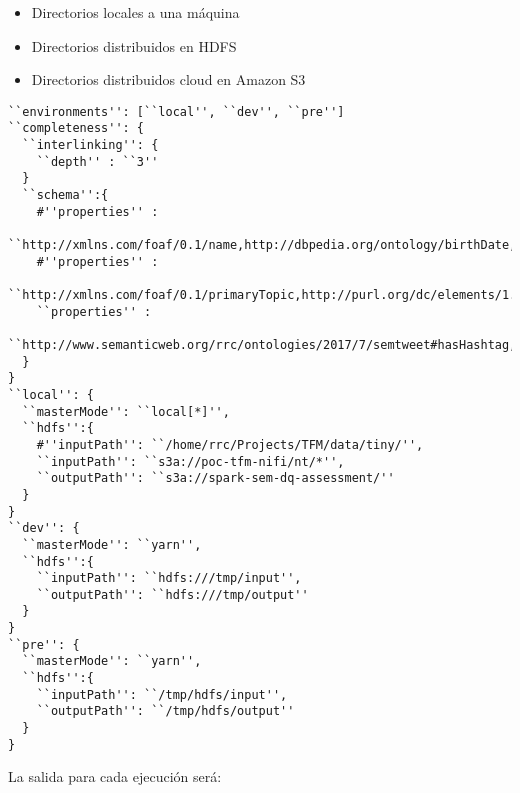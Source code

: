   \begin{itemize}
  \item Directorios locales a una máquina
  \item Directorios distribuidos en \acs{HDFS}
  \item Directorios distribuidos cloud en Amazon S3
  \end{itemize}


\lstset{escapechar=@,language=bash}
\begin{lstlisting}[caption={Archivo de configuración del job},captionpos=b,
    label=application.conf]
``environments'': [``local'', ``dev'', ``pre'']
``completeness'': {
  ``interlinking'': {
    ``depth'' : ``3''
  }
  ``schema'':{
    #''properties'' :
      ``http://xmlns.com/foaf/0.1/name,http://dbpedia.org/ontology/birthDate,http://xmlns.com/foaf/0.1/givenName''
    #''properties'' :
      ``http://xmlns.com/foaf/0.1/primaryTopic,http://purl.org/dc/elements/1.1/language''
    ``properties'' :
      ``http://www.semanticweb.org/rrc/ontologies/2017/7/semtweet#hasHashtag,http://www.semanticweb.org/rrc/ontologies/2017/7/semtweet#hasUser''
  }
}
``local'': {
  ``masterMode'': ``local[*]'',
  ``hdfs'':{
    #''inputPath'': ``/home/rrc/Projects/TFM/data/tiny/'',
    ``inputPath'': ``s3a://poc-tfm-nifi/nt/*'',
    ``outputPath'': ``s3a://spark-sem-dq-assessment/''
  }
}
``dev'': {
  ``masterMode'': ``yarn'',
  ``hdfs'':{
    ``inputPath'': ``hdfs:///tmp/input'',
    ``outputPath'': ``hdfs:///tmp/output''
  }
}
``pre'': {
  ``masterMode'': ``yarn'',
  ``hdfs'':{
    ``inputPath'': ``/tmp/hdfs/input'',
    ``outputPath'': ``/tmp/hdfs/output''
  }
}
\end{lstlisting}


La salida para cada ejecución será:

